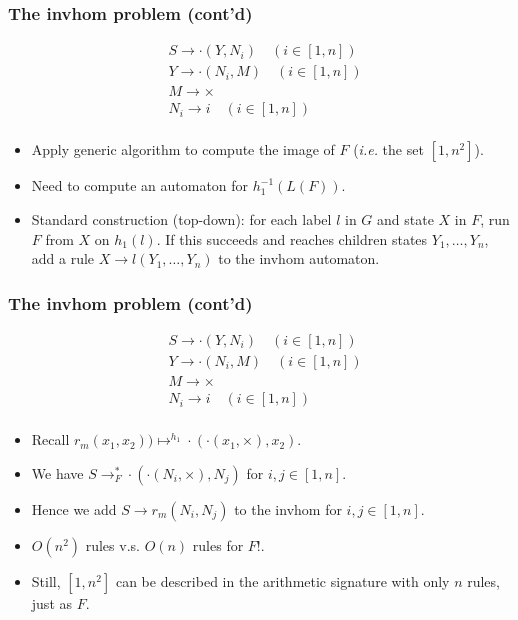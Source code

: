 \documentclass{beamer}
\begin{document}
\begin{frame}
  \frametitle{The invhom problem (cont'd)}
  \[
    \begin{aligned}
      & S \rightarrow \cdot(Y, N_i) \quad (i \in [1,n])\\
      & Y \rightarrow \cdot(N_i, M) \quad (i \in [1,n])\\
      & M \rightarrow \times\\
      & N_i \rightarrow i \quad (i \in [1,n])\\ 
    \end{aligned}    
    \]
    
    \begin{itemize}
    \item Apply generic algorithm to compute the image of $F$ (\emph{i.e.} the set $[1, n^2]$).
    \item Need to compute an automaton for $h_1^{-1}(L(F))$.
    \item Standard construction (top-down): for each label $l$ in $G$ and state $X$ in $F$, run $F$ from $X$ on $h_1(l)$. If this succeeds and reaches children states $Y_1, \dots, Y_n$, add a rule $X \rightarrow l(Y_1, \dots, Y_n)$ to the invhom automaton. 
    \end{itemize}
\end{frame}

\begin{frame}
  \frametitle{The invhom problem (cont'd)}
  \[
  \begin{aligned}
    & S \rightarrow \cdot(Y, N_i) \quad (i \in [1,n])\\
    & Y \rightarrow \cdot(N_i, M) \quad (i \in [1,n])\\
    & M \rightarrow \times\\
    & N_i \rightarrow i \quad (i \in [1,n])\\ 
  \end{aligned}    
  \]

  \begin{itemize}
  \item Recall $r_m(x_1, x_2)) \mapsto^{h_1} \cdot(\cdot(x_1, {\times}), x_2)$.
  \item We have $S \rightarrow^{*}_{F} \cdot(\cdot(N_i, {\times}), N_j)$ for $i,j \in [1,n]$.
  \item Hence we add $S \rightarrow r_m(N_i, N_j)$ to the invhom for $i,j \in [1,n]$.
  \item \alert{$O(n^2)$ rules v.s. $O(n)$ rules for $F$!}.
  \item Still, $[1,n^2]$ can be described in the arithmetic signature with only $n$ rules, just as $F$.
  \end{itemize}
    
\end{frame}
\end{document}
